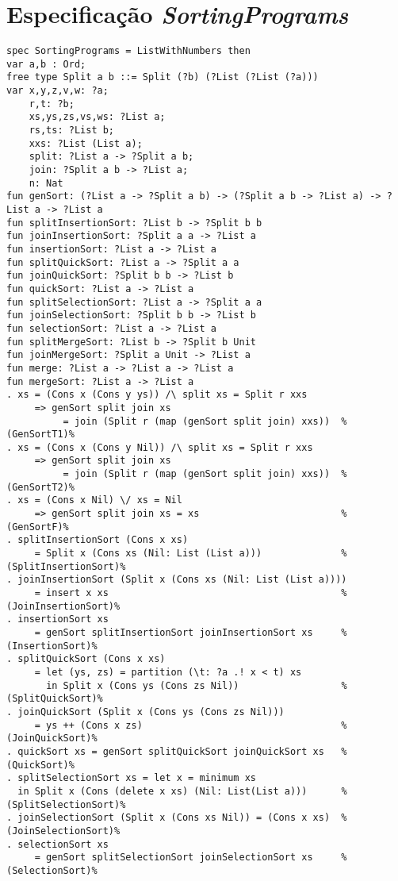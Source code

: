 \section{Especificação \textit{SortingPrograms}}
\label{appendix:lazySpec:sortingPrograms}
\begin{Verbatim}
spec SortingPrograms = ListWithNumbers then
var a,b : Ord;
free type Split a b ::= Split (?b) (?List (?List (?a)))
var x,y,z,v,w: ?a;
    r,t: ?b;
    xs,ys,zs,vs,ws: ?List a;
    rs,ts: ?List b;
    xxs: ?List (List a);
    split: ?List a -> ?Split a b;
    join: ?Split a b -> ?List a;
    n: Nat
fun genSort: (?List a -> ?Split a b) -> (?Split a b -> ?List a) -> ?List a -> ?List a
fun splitInsertionSort: ?List b -> ?Split b b
fun joinInsertionSort: ?Split a a -> ?List a
fun insertionSort: ?List a -> ?List a
fun splitQuickSort: ?List a -> ?Split a a
fun joinQuickSort: ?Split b b -> ?List b
fun quickSort: ?List a -> ?List a
fun splitSelectionSort: ?List a -> ?Split a a
fun joinSelectionSort: ?Split b b -> ?List b
fun selectionSort: ?List a -> ?List a
fun splitMergeSort: ?List b -> ?Split b Unit
fun joinMergeSort: ?Split a Unit -> ?List a
fun merge: ?List a -> ?List a -> ?List a
fun mergeSort: ?List a -> ?List a
. xs = (Cons x (Cons y ys)) /\ split xs = Split r xxs 
     => genSort split join xs
          = join (Split r (map (genSort split join) xxs))  %(GenSortT1)%
. xs = (Cons x (Cons y Nil)) /\ split xs = Split r xxs 
     => genSort split join xs 
          = join (Split r (map (genSort split join) xxs))  %(GenSortT2)%
. xs = (Cons x Nil) \/ xs = Nil
     => genSort split join xs = xs                         %(GenSortF)%
. splitInsertionSort (Cons x xs) 
     = Split x (Cons xs (Nil: List (List a)))              %(SplitInsertionSort)%
. joinInsertionSort (Split x (Cons xs (Nil: List (List a)))) 
     = insert x xs                                         %(JoinInsertionSort)%
. insertionSort xs 
     = genSort splitInsertionSort joinInsertionSort xs     %(InsertionSort)%
. splitQuickSort (Cons x xs) 
     = let (ys, zs) = partition (\t: ?a .! x < t) xs
       in Split x (Cons ys (Cons zs Nil))                  %(SplitQuickSort)%
. joinQuickSort (Split x (Cons ys (Cons zs Nil))) 
     = ys ++ (Cons x zs)                                   %(JoinQuickSort)%
. quickSort xs = genSort splitQuickSort joinQuickSort xs   %(QuickSort)%
. splitSelectionSort xs = let x = minimum xs
  in Split x (Cons (delete x xs) (Nil: List(List a)))      %(SplitSelectionSort)%
. joinSelectionSort (Split x (Cons xs Nil)) = (Cons x xs)  %(JoinSelectionSort)%
. selectionSort xs
     = genSort splitSelectionSort joinSelectionSort xs     %(SelectionSort)%

\end{Verbatim}
